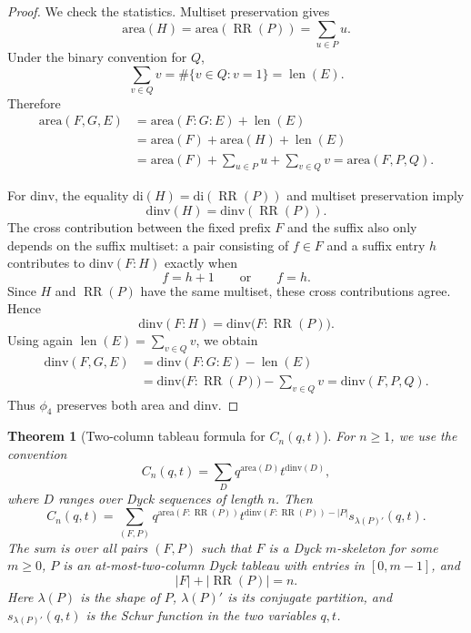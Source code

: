 \documentclass[11pt]{article}
\theoremstyle{plain}
\newtheorem{theorem}{Theorem}[section]
\theoremstyle{definition}
\theoremstyle{remark}
\newcommand{\di}{\mathrm{di}}
\newcommand{\dinv}{\mathrm{dinv}}
\newcommand{\area}{\mathrm{area}}
\begin{document}
\begin{proof}
We check the statistics.  Multiset preservation gives
\[
  \area(H)=\area(\operatorname{RR}(P))=\sum_{u\in P}u.
\]
Under the binary convention for \(Q\),
\[
  \sum_{v\in Q}v=\#\{v\in Q:v=1\}=\operatorname{len}(E).
\]
Therefore
\[
\begin{aligned}
  \area(F,G,E)
  &=\area(F:G:E)+\operatorname{len}(E)\\
  &=\area(F)+\area(H)+\operatorname{len}(E)\\
  &=\area(F)+\sum_{u\in P}u+
    \sum_{v\in Q}v
   =\area(F,P,Q).
\end{aligned}
\]

For \(\dinv\), the equality \(\di(H)=\di(\operatorname{RR}(P))\) and multiset
preservation imply
\[
  \dinv(H)=\dinv(\operatorname{RR}(P)).
\]
The cross contribution between the fixed prefix \(F\) and the suffix also
only depends on the suffix multiset: a pair consisting of \(f\in F\) and a
suffix entry \(h\) contributes to \(\dinv(F:H)\) exactly when
\[
  f=h+1\qquad\text{or}\qquad f=h.
\]
Since \(H\) and \(\operatorname{RR}(P)\) have the same multiset, these cross
contributions agree.  Hence
\[
  \dinv(F:H)=\dinv\bigl(F:\operatorname{RR}(P)\bigr).
\]
Using again \(\operatorname{len}(E)=\sum_{v\in Q}v\), we obtain
\[
\begin{aligned}
  \dinv(F,G,E)
  &=\dinv(F:G:E)-\operatorname{len}(E)\\
  &=\dinv\bigl(F:\operatorname{RR}(P)\bigr)-\sum_{v\in Q}v
   =\dinv(F,P,Q).
\end{aligned}
\]
Thus \(\phi_4\) preserves both area and \(\dinv\).
\end{proof}

\begin{theorem}[Two-column tableau formula for \(C_n(q,t)\)]
\label{thm:section4-qt-catalan-formula}
For \(n\ge 1\), we use the convention
\[
  C_n(q,t)=\sum_D q^{\area(D)}t^{\dinv(D)},
\]
where \(D\) ranges over Dyck sequences of length \(n\).  Then
\[
  C_n(q,t)
  =
  \sum_{(F,P)}
  q^{\area(F:\operatorname{RR}(P))}
  t^{\dinv(F:\operatorname{RR}(P))-|P|}
  s_{\lambda(P)'}(q,t).
\]
The sum is over all pairs \((F,P)\) such that \(F\) is a Dyck
\(m\)-skeleton for some \(m\ge 0\), \(P\) is an at-most-two-column Dyck tableau
with entries in \([0,m-1]\), and
\[
  |F|+|\operatorname{RR}(P)|=n.
\]
Here \(\lambda(P)\) is the shape of \(P\), \(\lambda(P)'\) is its conjugate
partition, and \(s_{\lambda(P)'}(q,t)\) is the Schur function in the two
variables \(q,t\).
\end{theorem}
\end{document}
